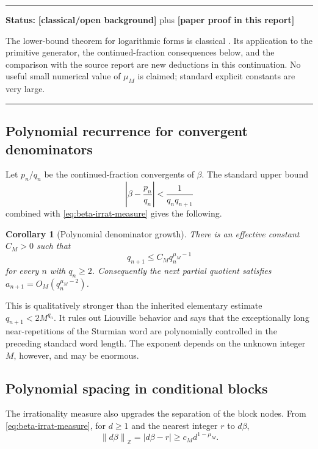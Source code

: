 \documentclass[11pt,oneside]{article}
\newtheorem{corollary}[theorem]{Corollary}
\theoremstyle{definition}
\theoremstyle{remark}
\newcommand{\Z}{\mathbb Z}
\newcommand{\distZ}[1]{\left\lVert #1\right\rVert_{\Z}}
\newcommand{\statusnew}{\textcolor{newgreen}{\textbf{[paper proof in this report]}}}
\newcommand{\statusknown}{\textcolor{classicalgray}{\textbf{[classical/\allowbreak open background]}}}
\newenvironment{statusbox}[1]
{\begin{center}\begin{minipage}{0.94\textwidth}\raggedright\hbadness=10000\hrule
\vspace{0.45em}\textbf{Status:} #1\par\vspace{0.35em}}
{\vspace{0.35em}\hrule\end{minipage}\end{center}}
\begin{document}
\begin{statusbox}{\statusknown{} plus \statusnew}
The lower-bound theorem for logarithmic forms is classical
\cite{Baker1975,BakerWustholz1993,Matveev2000}.  Its application to the primitive generator,
the continued-fraction consequences below, and the comparison with the source report are
new deductions in this continuation.  No useful small numerical value of $\mu_M$ is claimed;
standard explicit constants are very large.
\end{statusbox}

\subsection{Polynomial recurrence for convergent denominators}

Let $p_n/q_n$ be the continued-fraction convergents of $\beta$.  The standard upper bound
\[
  \left|\beta-\frac{p_n}{q_n}\right|<\frac1{q_nq_{n+1}}
\]
combined with \eqref{eq:beta-irrat-measure} gives the following.

\begin{corollary}[Polynomial denominator growth]\label{cor:q-growth}
There is an effective constant $C_M>0$ such that
\begin{equation}\label{eq:q-growth}
  q_{n+1}\le C_M q_n^{\mu_M-1}
\end{equation}
for every $n$ with $q_n\ge2$.  Consequently the next partial quotient satisfies
$a_{n+1}=O_M(q_n^{\mu_M-2})$.
\end{corollary}

This is qualitatively stronger than the inherited elementary estimate
$q_{n+1}<2M^{q_n}$.  It rules out Liouville behavior and says that the exceptionally long
near-repetitions of the Sturmian word are polynomially controlled in the preceding standard
word length.  The exponent depends on the unknown integer $M$, however, and may be enormous.

\subsection{Polynomial spacing in conditional blocks}

The irrationality measure also upgrades the separation of the block nodes.  From
\eqref{eq:beta-irrat-measure}, for $d\ge1$ and the nearest integer $r$ to $d\beta$,
\begin{equation}\label{eq:beta-mod-one}
  \distZ{d\beta}=|d\beta-r|
  \ge c_M d^{1-\mu_M}.
\end{equation}
\end{document}
